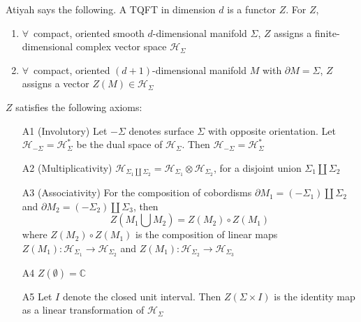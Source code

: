 \documentclass[a4paper,titlepage,twoside]{book}
\begin{document}
Atiyah says the following.  A TQFT in dimension $d$ is a functor $Z$.  For $Z$,
\begin{enumerate}
\item $\forall \, $ compact, oriented smooth $d$-dimensional manifold $\Sigma$, $Z$ assigns a finite-dimensional complex vector space $\mathcal{H}_{\Sigma}$ 
\item $\forall \, $ compact, oriented $(d+1)$-dimensional manifold $M$ with $\partial M = \Sigma$, $Z$ assigns a vector $Z(M) \in \mathcal{H}_{\Sigma}$
\end{enumerate}

$Z$ satisfies the following axioms:
\begin{enumerate}
  \item[A1] (Involutory) Let $-\Sigma$ denotes surface $\Sigma$ with opposite orientation.  Let $\mathcal{H}_{-\Sigma} = \mathcal{H}^*_{\Sigma}$ be the dual space of $\mathcal{H}_{\Sigma}$.  Then $\mathcal{H}_{-\Sigma} = \mathcal{H}^*_{\Sigma}$
\item[A2] (Multiplicativity) $\mathcal{H}_{ \Sigma_1 \coprod \Sigma_2 } = \mathcal{H}_{ \Sigma_1} \otimes \mathcal{H}_{ \Sigma_2 }$, for a disjoint union $\Sigma_1 \coprod \Sigma_2$
\item[A3] (Associativity) For the composition of cobordisms $\partial M_1 = (-\Sigma_1) \coprod \Sigma_2$ and $\partial M_2 = (-\Sigma_2) \coprod \Sigma_3$, then 
\begin{equation}
Z{ (M_1 \bigcup M_2) } = Z{ (M_2) } \circ Z{ (M_1)}
\end{equation}
where $Z{ (M_2) } \circ Z{ (M_1)}$ is the composition of linear maps $Z(M_1): \mathcal{H}_{\Sigma_1} \to \mathcal{H}_{\Sigma_2}$ and $Z(M_1): \mathcal{H}_{\Sigma_2} \to \mathcal{H}_{\Sigma_3}$
\item[A4] $Z(\emptyset) = \mathbb{C}$
\item[A5] Let $I$ denote the closed unit interval.  Then $Z(\Sigma \times I)$ is the identity map as a linear transformation of $\mathcal{H}_{\Sigma}$
\end{enumerate}
\end{document}
